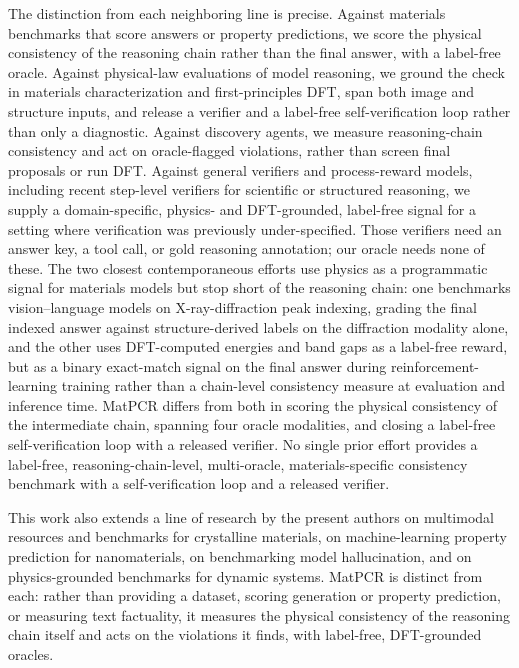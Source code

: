 \documentclass[pdflatex,sn-nature]{sn-jnl}
\begin{document}
The distinction from each neighboring line is precise. Against materials benchmarks
that score answers or property predictions,\cite{lai2025materials,llm4matbench2024,atomworld2025,matterchat2026}
we score the physical consistency of the reasoning chain rather than the final
answer, with a label-free oracle. Against physical-law evaluations of model
reasoning,\cite{conservationbench2026,p1vl2026} we ground the check in materials
characterization and first-principles DFT, span both image and structure inputs, and
release a verifier and a label-free self-verification loop rather than only a diagnostic.
Against discovery agents,\cite{dreams2025,physrej2025} we measure reasoning-chain
consistency and act on oracle-flagged violations, rather than screen final proposals or
run DFT. Against general verifiers
and process-reward models,\cite{processbench2025,compassverifier2025,t1verify2025}
including recent step-level verifiers for scientific or structured reasoning,\cite{sciprm2026,vprm2026}
we supply a domain-specific, physics- and DFT-grounded, label-free signal for a setting
where verification was previously under-specified. Those verifiers need an answer key, a
tool call, or gold reasoning annotation; our oracle needs none of these. The two closest contemporaneous
efforts use physics as a programmatic signal for materials models but stop short of the
reasoning chain: one benchmarks vision--language models on X-ray-diffraction peak
indexing, grading the final indexed answer against structure-derived labels on the
diffraction modality alone,\cite{crystalxrdbench2026} and the other uses DFT-computed
energies and band gaps as a label-free reward, but as a binary exact-match signal on the
final answer during reinforcement-learning training rather than a chain-level
consistency measure at evaluation and inference time.\cite{matpref2026} MatPCR differs
from both in scoring the physical consistency of the intermediate chain, spanning four
oracle modalities, and closing a label-free self-verification loop with a released
verifier. No single prior effort provides a label-free, reasoning-chain-level,
multi-oracle, materials-specific consistency benchmark with a self-verification loop and
a released verifier.

This work also extends a line of research by the present authors on multimodal
resources and benchmarks for crystalline
materials,\cite{polat2025crysmtm,polat2025rcrystals} on machine-learning property
prediction for nanomaterials,\cite{polat2025quantumshellnet,polat2024multimodalnp} on
benchmarking model hallucination,\cite{abdaljalil2025halluverse} and on
physics-grounded benchmarks for dynamic systems.\cite{khanbayov2026iris} MatPCR is
distinct from each: rather than providing a dataset, scoring generation or property
prediction, or measuring text factuality, it measures the physical consistency of the
reasoning chain itself and acts on the violations it finds, with label-free, DFT-grounded
oracles.
\end{document}
